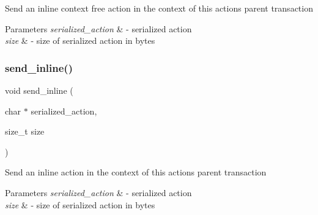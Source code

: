 Send an inline context free action in the context of this action\textquotesingle{}s parent transaction 
\begin{DoxyParams}{Parameters}
{\em serialized\+\_\+action} & -\/ serialized action \\
\hline
{\em size} & -\/ size of serialized action in bytes \\
\hline
\end{DoxyParams}
\mbox{\label{group__actioncapi_gada68da99a95a5b25e9f5d43af255c63e}} 
\subsubsection{\texorpdfstring{send\+\_\+inline()}{send\_inline()}}
{\footnotesize\ttfamily void send\+\_\+inline (\begin{DoxyParamCaption}\item[{char $\ast$}]{serialized\+\_\+action,  }\item[{size\+\_\+t}]{size }\end{DoxyParamCaption})}

Send an inline action in the context of this action\textquotesingle{}s parent transaction 
\begin{DoxyParams}{Parameters}
{\em serialized\+\_\+action} & -\/ serialized action \\
\hline
{\em size} & -\/ size of serialized action in bytes \\
\hline
\end{DoxyParams}
